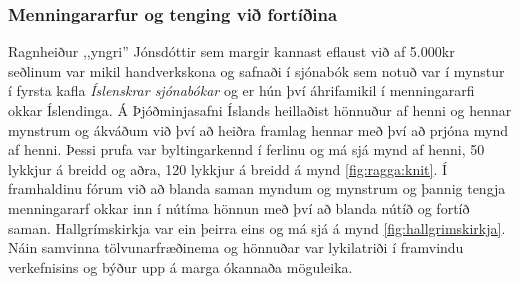 \documentclass[a4paper,12pt,twoside]{article}
\begin{document}
\subsubsection{Menningararfur og tenging við fortíðina}
Ragnheiður ,,yngri'' Jónsdóttir sem margir kannast eflaust við af 5.000kr seðlinum var mikil handverkskona og safnaði í sjónabók sem notuð var í mynstur í fyrsta kafla \textit{Íslenskrar sjónabókar} og er hún því áhrifamikil í menningararfi okkar Íslendinga. Á Þjóðminjasafni Íslands heillaðist hönnuður af henni og hennar mynstrum og ákváðum við því að heiðra framlag hennar með því að prjóna mynd af henni. Þessi prufa var byltingarkennd í ferlinu og má sjá mynd af henni, 50 lykkjur á breidd og aðra, 120 lykkjur á breidd á mynd \ref{fig:ragga:knit}. Í framhaldinu fórum við að blanda saman myndum og mynstrum og þannig tengja menningararf okkar inn í nútíma hönnun með því að blanda nútíð og fortíð saman. Hallgrímskirkja var ein þeirra eins og má sjá á mynd \ref{fig:hallgrimskirkja}. Náin samvinna tölvunarfræðinema og hönnuðar var lykilatriði í framvindu verkefnisins og býður upp á marga ókannaða möguleika. 
\end{document}
